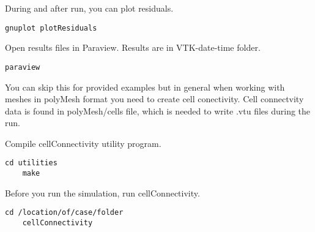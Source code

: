 \documentclass[11pt,a4paper]{report}
\begin{document}
During and after run, you can plot residuals.

\begin{lstlisting}[style=BashInputStyle]
    gnuplot plotResiduals
\end{lstlisting}

Open results files in Paraview. Results are in VTK-date-time folder.

\begin{lstlisting}[style=BashInputStyle]
    paraview
\end{lstlisting}

You can skip this for provided examples but in general when working with meshes in polyMesh format you need to create cell conectivity. Cell connectvity data is found in polyMesh/cells file, which is needed to write .vtu files during the run.

Compile cellConnectivity utility program.

\begin{lstlisting}[style=BashInputStyle]
    cd utilities
    make
\end{lstlisting}

Before you run the simulation, run cellConnectivity.

\begin{lstlisting}[style=BashInputStyle]
    cd /location/of/case/folder
    cellConnectivity
\end{lstlisting}


%

%
\end{document}
